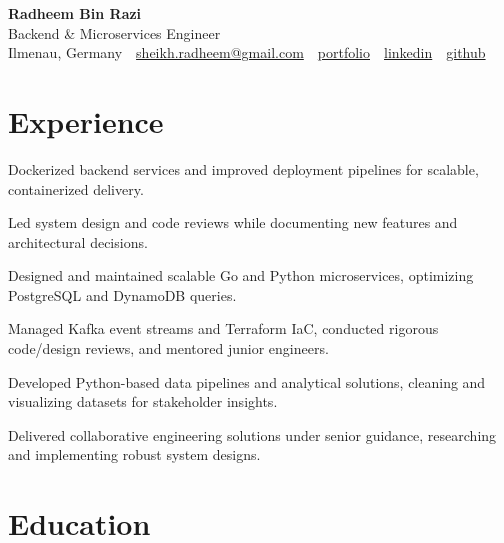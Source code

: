\documentclass[11pt,a4paper]{resume}
\makeatletter
\newcommand{\Portfolio}{https://radheem.github.io/my-cv}
\newcommand{\PortfolioText}{portfolio}
\newcommand{\GitHub}{https://github.com/radheem}
\newcommand{\LinkedIn}{https://www.linkedin.com/in/radheem-razi}
\newcommand{\Email}{sheikh.radheem@gmail.com}
\makeatother
\begin{document}
\begin{center}
  {\huge\bfseries Radheem Bin Razi}\\[3pt]
  {\large Backend \& Microservices Engineer}\\[6pt]
  \small
  Ilmenau, Germany \,\textbar\,
  \href{mailto:\Email}{\Email} \,\textbar\,
  \href{\Portfolio}{\PortfolioText} \,\textbar\,
  \href{\LinkedIn}{linkedin} \,\textbar\,
  \href{\GitHub}{github}
\end{center}
\vspace{2pt}

\section{Experience}

\bullets
  \item Dockerized backend services and improved deployment pipelines for scalable, containerized delivery.
  \item Led system design and code reviews while documenting new features and architectural decisions.
\bulletsend
\vspace{3pt}
\bullets
  \item Designed and maintained scalable Go and Python microservices, optimizing PostgreSQL and DynamoDB queries.
  \item Managed Kafka event streams and Terraform IaC, conducted rigorous code/design reviews, and mentored junior engineers.
\bulletsend
\vspace{3pt}
\bullets
  \item Developed Python-based data pipelines and analytical solutions, cleaning and visualizing datasets for stakeholder insights.
  \item Delivered collaborative engineering solutions under senior guidance, researching and implementing robust system designs.
\bulletsend
\vspace{3pt}

\section{Education}

\vspace{2pt}
\end{document}

